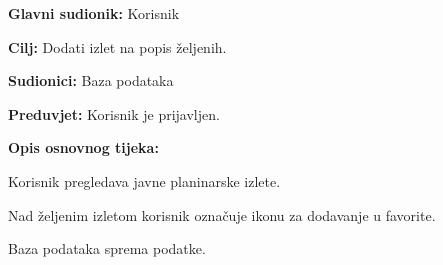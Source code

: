 		
		\noindent {}
		\begin{packed_item}
			
			\item \textbf{Glavni sudionik: } Korisnik
			\item  \textbf{Cilj:} Dodati izlet na popis željenih.
			\item  \textbf{Sudionici:} Baza podataka
			\item  \textbf{Preduvjet:} Korisnik je prijavljen.
			\item  \textbf{Opis osnovnog tijeka:}
			
			\item[] \begin{packed_enum}
				
				\item Korisnik pregledava javne planinarske izlete.
				\item Nad željenim izletom korisnik označuje ikonu za dodavanje u favorite.
				\item Baza podataka sprema podatke.
			
			\end{packed_enum}
		\end{packed_item}
		
		
		
